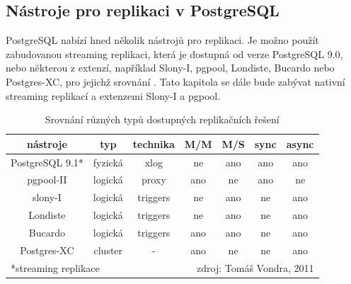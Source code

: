       \subsection{Nástroje pro replikaci v PostgreSQL}

      PostgreSQL nabízí hned několik nástrojů pro replikaci. Je možno použít zabudovanou streaming replikaci, která je dostupná od verze PostgreSQL 9.0, nebo některou z extenzí, například Slony-I, pgpool, Londiste, Bucardo nebo Postgres-XC, pro jejichž srovnání . Tato kapitola se dále bude zabývat nativní streaming replikací a extenzemi Slony-I a pgpool.

        \begin{table}[H]
          \caption{Srovnání různých typů dostupných replikačních řešení}
          \label{tSrovnaniReplikace}
          \begin{footnotesize}
            \begin{center}
              \begin{tabular}{|c|cccccc|}
                \hline
                {\bf \color{purpurova7}nástroje}	& {\bf \color{purpurova7}typ} & {\bf \color{purpurova7}technika} & {\bf \color{purpurova7}M/M} & {\bf \color{purpurova7}M/S} & {\bf \color{purpurova7}sync} & a{\bf \color{purpurova7}sync} \\
                \hline
                PostgreSQL 9.1* & fyzická & xlog & ne & ano & ano & ano \\
                     pgpool-II & logická & proxy & ano & ne & ano & ne \\
                       slony-I & logická & triggers & ne & ano & ne & ano \\
                      Londiste & logická & triggers & ne & ano & ne & ano \\
                       Bucardo & logická & triggers & ano & ano & ne & ano \\
                   Postgres-XC & cluster & - & ano & ne & ne & ano \\
                \hline
                \multicolumn{3}{l}{\scriptsize{*streaming replikace}} & \multicolumn{4}{r}{\scriptsize{zdroj: Tomáš Vondra, 2011}}\\
              \end{tabular}
            \end{center}
          \end{footnotesize}
        \end{table}

